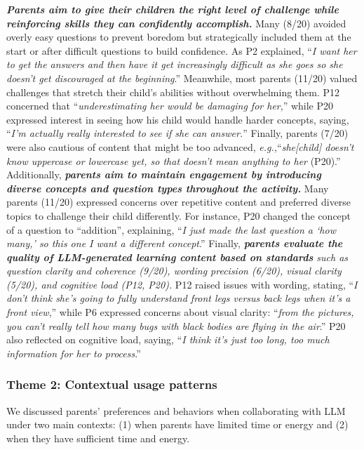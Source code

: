 \textit{\textbf{Parents aim to give their children the right level of challenge while reinforcing skills they can confidently accomplish.}} Many (8/20) avoided overly easy questions to prevent boredom but strategically included them at the start or after difficult questions to build confidence. As P2 explained, ``\textit{I want her to get the answers and then have it get increasingly difficult as she goes so she doesn't get discouraged at the beginning}.'' Meanwhile, most parents (11/20) valued challenges that stretch their child's abilities without overwhelming them. P12 concerned that ``\textit{underestimating her would be damaging for her},'' while P20 expressed interest in seeing how his child would handle harder concepts, saying, ``\textit{I'm actually really interested to see if she can answer.}'' Finally, parents (7/20) were also cautious of content that might be too advanced, \textit{e.g.,}``\textit{she[child] doesn't know uppercase or lowercase yet, so that doesn't mean anything to her} (P20).'' Additionally, \textit{\textbf{parents aim to maintain engagement by introducing diverse concepts and question types throughout the activity.}} Many parents (11/20) expressed concerns over repetitive content and preferred diverse topics to challenge their child differently. For instance, P20 changed the concept of a question to ``addition'', explaining, ``\textit{I just made the last question a `how many,' so this one I want a different concept}.'' Finally, \textit{\textbf{parents evaluate the quality of LLM-generated learning content based on standards} such as question clarity and coherence (9/20), wording precision (6/20), visual clarity (5/20), and cognitive load (P12, P20).} P12 raised issues with wording, stating, ``\textit{I don't think she's going to fully understand front legs versus back legs when it's a front view},'' while P6 expressed concerns about visual clarity: ``\textit{from the pictures, you can't really tell how many bugs with black bodies are flying in the air}.'' P20 also reflected on cognitive load, saying, ``\textit{I think it's just too long, too much information for her to process}.'' 

\subsubsection{Theme 2: Contextual usage patterns}
We discussed parents' preferences and behaviors when collaborating with LLM under two main contexts: (1) when parents have limited time or energy and (2) when they have sufficient time and energy.


